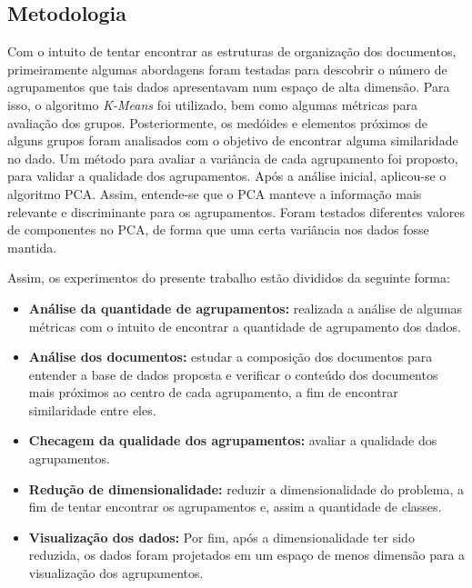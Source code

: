 \documentclass[conference]{IEEEtran}
\begin{document}
\subsection{Metodologia} \label{sec:met}

Com o intuito de tentar encontrar as estruturas de organização dos documentos, primeiramente algumas abordagens foram testadas para descobrir o número de agrupamentos que tais dados apresentavam num espaço de alta dimensão. Para isso, o algoritmo \emph{K-Means} foi utilizado, bem como algumas métricas para avaliação dos grupos. Posteriormente, os medóides e elementos próximos de alguns grupos foram analisados com o objetivo de encontrar alguma similaridade no dado. Um método para avaliar a variância de cada agrupamento foi proposto, para validar a qualidade dos agrupamentos. Após a análise inicial, aplicou-se o algoritmo PCA. Assim, entende-se que o PCA manteve a informação mais relevante e discriminante para os agrupamentos. Foram testados diferentes valores de componentes no PCA, de forma que uma certa variância nos dados fosse mantida.

Assim, os experimentos do presente trabalho estão divididos da seguinte forma:

\begin{itemize}
	\item \small \textbf{Análise da quantidade de agrupamentos:} realizada a análise de algumas métricas com o intuito de encontrar a quantidade de agrupamento dos dados.

	\item \small \textbf{Análise dos documentos:} estudar a composição dos documentos para entender a base de dados proposta e verificar o conteúdo dos documentos mais próximos ao centro de cada agrupamento, a fim de encontrar similaridade entre eles.

	\item \small \textbf{Checagem da qualidade dos agrupamentos:} avaliar a qualidade dos agrupamentos.

	\item \small \textbf{Redução de dimensionalidade:} reduzir a dimensionalidade do problema, a fim de tentar encontrar os agrupamentos e, assim a quantidade de classes.

	\item \small \textbf{Visualização dos dados:} Por fim, após a dimensionalidade ter sido reduzida, os dados foram projetados em um espaço de menos dimensão para a visualização dos agrupamentos.

\end{itemize}
\end{document}
